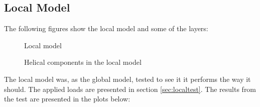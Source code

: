 \subsection{Local Model}
The following figures show the local model and some of the layers: 

\begin{figure}[H]
\hfill
{}\hfill
\caption[$\; \:$Local model ]{Local model}
\label{fig:loc1}
\end{figure}
\noindent 

\begin{figure}[H]
\hfill
{}\hfill
\caption[$\; \:$Helical components in the local model ]{Helical components in the local model}
\label{fig:loc2}
\end{figure}

\noindent The local model was, as the global model, tested to see it it performs the way it should. The applied loads are presented in section \ref{sec:localtest}. The results from the test are presented in the plots below: 


